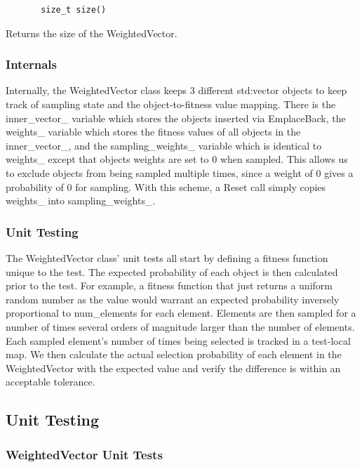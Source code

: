 \documentclass[12pt]{article}
\begin{document}
     \begin{verbatim}
       size_t size()
     \end{verbatim}

     Returns the size of the WeightedVector.

    \subsubsection{Internals}

    Internally, the WeightedVector class keeps 3 different std:vector objects
    to keep track of sampling state and the object-to-fitness value mapping.
    There is the inner\_vector\_ variable which stores the objects
    inserted via EmplaceBack, the weights\_ variable which stores the
    fitness values of all objects in the inner\_vector\_, and the
    sampling\_weights\_ variable which is identical to weights\_
    except that objects weights are set to 0 when sampled. This allows us to
    exclude objects from being sampled multiple times, since a weight of 0
    gives a probability of 0 for sampling. With this scheme, a Reset call
    simply copies weights\_ into sampling\_weights\_.

    \subsubsection{Unit Testing}

    The WeightedVector class' unit tests all start by defining a fitness
    function unique to the test. The expected probability of each object is
    then calculated prior to the test. For example, a fitness function that
    just returns a uniform random number as the value would warrant an expected
    probability inversely proportional to num\_elements for each element.
    Elements are then sampled for a number of times several orders of magnitude
    larger than the number of elements. Each sampled element's number of times
    being selected is tracked in a test-local map. We then calculate the actual
    selection probability of each element in the WeightedVector with the
    expected value and verify the difference is within an acceptable tolerance.
      
  \subsection{Unit Testing}


    \subsubsection{WeightedVector Unit Tests}
\end{document}
